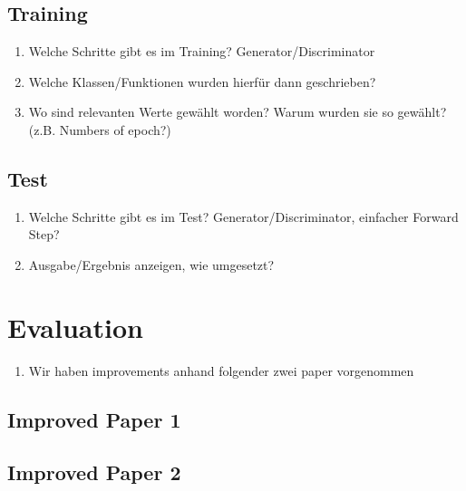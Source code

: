 \documentclass[fleqn,10pt]{SelfArx} %
\begin{document}
\subsection{Training}
\begin{enumerate}[noitemsep] %
	\item Welche Schritte gibt es im Training? Generator/Discriminator
	\item Welche Klassen/Funktionen wurden hierfür dann geschrieben?
	\item Wo sind relevanten Werte gewählt worden? Warum wurden sie so gewählt?(z.B. Numbers of epoch?)
\end{enumerate}

\subsection{Test}
\begin{enumerate}[noitemsep] %
	\item Welche Schritte gibt es im Test? Generator/Discriminator, einfacher Forward Step?
	\item Ausgabe/Ergebnis anzeigen, wie umgesetzt?
\end{enumerate}

\section{Evaluation}
\begin{enumerate}[noitemsep] %
	\item Wir haben improvements anhand folgender zwei paper vorgenommen
\end{enumerate}

\subsection{Improved Paper 1}

\subsection{Improved Paper 2}

\end{document}
